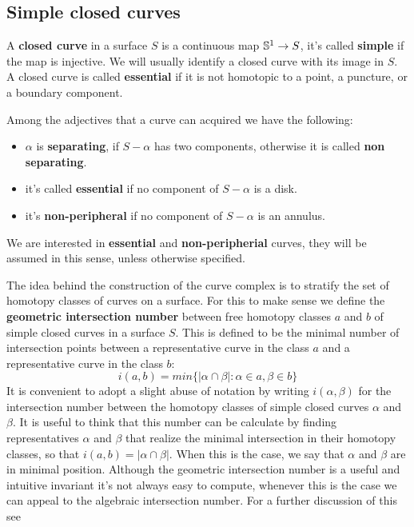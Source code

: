 \subsection{Simple closed curves}

\begin{defini}
A \textbf{closed curve} in a surface $S$ is a continuous map $\S^{1}\to S$, it's called \textbf{simple} if the map is injective. We will usually identify a closed curve with its image in $S$. A closed curve is called \textbf{essential} if it is not homotopic to a point, a puncture, or a boundary component.
\end{defini}
Among the adjectives that a curve can acquired we have the following:
\begin{itemize}
    \item $\alpha$ is \textbf{separating}, if $S-\alpha$ has two components, otherwise it is called \textbf{non separating}.
    \item it's called \textbf{essential} if no component of $S- \alpha$ is a disk.
    \item it's \textbf{non-peripheral} if no component of $S - \alpha$ is an annulus. 
\end{itemize}

We are interested in \textbf{essential} and \textbf{non-peripherial} curves, they will be assumed in this sense, unless otherwise specified.

The idea behind the construction of the curve complex is to stratify the set of homotopy classes of curves on a surface. For this to make sense we define the \textbf{geometric intersection number} between free homotopy classes $a$ and $b$ of simple closed curves in a surface $S$. This is defined to be the minimal number of intersection points between a representative curve in the class $a$ and a representative curve in the class $b$:
$$i(a,b) = min \{ |\alpha \cap \beta| : \alpha \in a, \beta \in b \}$$
It is convenient to adopt a slight abuse of notation by writing $i(\alpha, \beta)$ for the intersection number between the homotopy classes of simple closed curves $\alpha$ and $\beta$. It is useful to think that this number can be calculate by finding representatives $\alpha$ and $\beta$ that realize the minimal intersection in their homotopy classes, so that $i(a, b) = |\alpha \cap \beta|$. When this is the case, we say that $\alpha$ and $\beta$ are in minimal position. Although the geometric intersection number is a useful and intuitive invariant it's not always easy to compute, whenever this is the case we can appeal to the algebraic intersection number. For a further discussion of this see \cite[Farb]{Farb}

